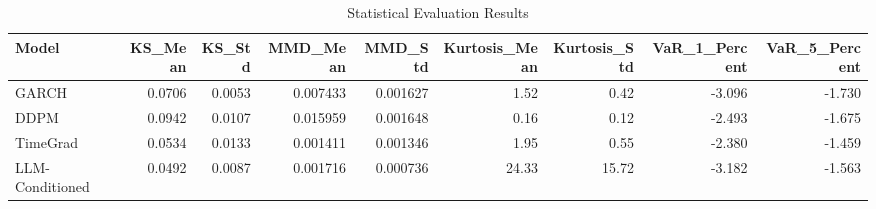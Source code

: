 \begin{table}
\caption{Statistical Evaluation Results}
\label{tab:statistical_evaluation}
\begin{tabular}{l|r|r|r|r|r|r|r|r}
\toprule
Model & KS_Mean & KS_Std & MMD_Mean & MMD_Std & Kurtosis_Mean & Kurtosis_Std & VaR_1_Percent & VaR_5_Percent \\
\midrule
GARCH & 0.0706 & 0.0053 & 0.007433 & 0.001627 & 1.52 & 0.42 & -3.096 & -1.730 \\
DDPM & 0.0942 & 0.0107 & 0.015959 & 0.001648 & 0.16 & 0.12 & -2.493 & -1.675 \\
TimeGrad & 0.0534 & 0.0133 & 0.001411 & 0.001346 & 1.95 & 0.55 & -2.380 & -1.459 \\
LLM-Conditioned & 0.0492 & 0.0087 & 0.001716 & 0.000736 & 24.33 & 15.72 & -3.182 & -1.563 \\
\bottomrule
\end{tabular}
\end{table}
